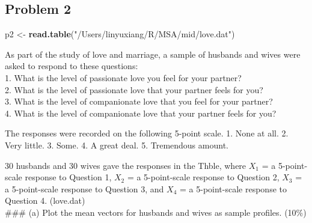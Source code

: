 \documentclass[]{article}
\newenvironment{Shaded}{\begin{snugshade}}{\end{snugshade}}
\newcommand{\DataTypeTok}[1]{\textcolor[rgb]{0.13,0.29,0.53}{#1}}
\newcommand{\KeywordTok}[1]{\textcolor[rgb]{0.13,0.29,0.53}{\textbf{#1}}}
\newcommand{\NormalTok}[1]{#1}
\newcommand{\OperatorTok}[1]{\textcolor[rgb]{0.81,0.36,0.00}{\textbf{#1}}}
\newcommand{\StringTok}[1]{\textcolor[rgb]{0.31,0.60,0.02}{#1}}
\begin{document}
\hypertarget{problem-2}{%
\subsection{Problem 2}\label{problem-2}}

\begin{Shaded}
\begin{Highlighting}[]
\NormalTok{p2 <-}\StringTok{ }\KeywordTok{read.table}\NormalTok{(}\StringTok{"/Users/linyuxiang/R/MSA/mid/love.dat"}\NormalTok{)}
\end{Highlighting}
\end{Shaded}

As part of the study of love and marriage, a sample of husbands and
wives were asked to respond to these questions:\\
1. What is the level of passionate love you feel for your partner?\\
2. What is the level of passionate love that your partner feels for
you?\\
3. What is the level of companionate love that you feel for your
partner?\\
4. What is the level of companionate love that your partner feels for
you?

The responses were recorded on the following 5-point scale. 1. None at
all. 2. Very little. 3. Some. 4. A great deal. 5. Tremendous amount.

30 husbands and 30 wives gave the responses in the Thble, where \(X_1\)
= a 5-point- scale response to Question 1, \(X_2\) = a 5-point-scale
response to Question 2, \(X_3\) = a 5-point-scale response to Question
3, and \(X_4\) = a 5-point-scale response to Question 4. (love.dat)\\
\#\#\# (a) Plot the mean vectors for husbands and wives as sample
profiles. (10\%)

\begin{Shaded}
\end{Shaded}
\end{document}
